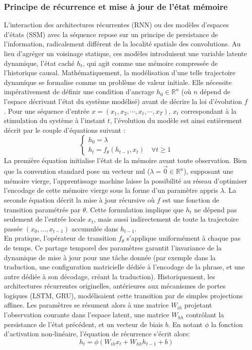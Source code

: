 \subsubsection{Principe de récurrence et mise à jour de l'état mémoire}
\label{seq:RNNPrincipe}
L'interaction des architectures récurrentes (RNN) ou des modèles d'espaces d'états (SSM) avec la séquence repose sur un principe de persistance de l'information, radicalement différent de la localité spatiale des convolutions. Au lieu d'agréger un voisinage statique, ces modèles introduisent une variable latente dynamique, l'état caché $h_t$, qui agit comme une mémoire compressée de l'historique causal. Mathématiquement, la modélisation d'une telle trajectoire dynamique se formalise comme un problème de valeur initiale. Elle nécessite impérativement de définir une condition d'ancrage $h_0 \in \mathbb{R}^n$ (où $n$ dépend de l'espace décrivant l'état du système modélisé) avant de décrire la loi d'évolution $f$. Pour une séquence d'entrée $x = (x_1, x_2, \cdots, x_t, \cdots, x_T)$, $x_t$ correspondant à la stimulation du système à l'instant $t$, l'évolution du modèle est ainsi entièrement décrit par le couple d'équations suivant :
\begin{equation}
\label{eq:recurrent}
\begin{cases} h_0 = \lambda \\ h_t = f_{\theta}(h_{t-1}, x_t) \quad \forall t \ge 1 \end{cases}
\end{equation}
La première équation initialise l'état de la mémoire avant toute observation. Bien que la convention standard pose un vecteur nul ($\lambda = \vec{0} \in \mathbb{R}^n$), supposant une mémoire vierge, l'apprentissage machine laisse la possibilité au réseau d'optimiser l'encodage de cette mémoire vierge sous la forme d'un paramètre appris $\lambda$. La seconde équation décrit la mise à jour récursive où $f$ est une fonction de transition paramétrée par $\theta$. Cette formulation implique que $h_t$ ne dépend pas seulement de l'entrée locale $x_t$, mais aussi indirectement de toute la trajectoire passée $(x_0, \dots, x_{t-1})$ accumulée dans $h_{t-1}$.\\

En pratique, l'opérateur de transition $f_\theta$ s'applique uniformément à chaque pas de temps. Ce partage temporel des paramètres garantit l'invariance de la dynamique de mise à jour pour une tâche donnée (par exemple dans la traduction, une configuration matricielle dédiée à l'encodage de la phrase, et une autre dédiée à son décodage, créant la traduction). Historiquement, les architectures récurrentes originelles, antérieures aux mécanismes de portes logiques (LSTM, GRU), modélisaient cette transition par de simples projections affines. Les paramètres se résument alors à une matrice $W_{ih}$ projetant l'observation courante dans l'espace latent, une matrice $W_{hh}$ contrôlant la persistance de l'état précédent, et un vecteur de biais $b$. En notant $\phi$ la fonction d'activation non-linéaire, l'équation de récurrence s'écrit alors:
\begin{equation}
\label{eq:RNN}
h_t = \phi(W_{ih}x_t + W_{hh}h_{t-1} + b)
\end{equation}

